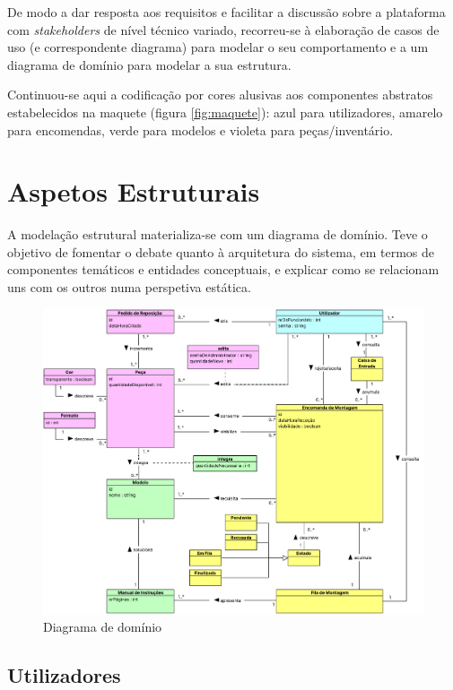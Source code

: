         De modo a dar resposta aos requisitos e facilitar a discussão sobre a plataforma com \textit{stakeholders} de nível técnico variado, recorreu-se à elaboração de casos de uso (e correspondente diagrama) para modelar o seu comportamento e a um diagrama de domínio para modelar a sua estrutura.

        Continuou-se aqui a codificação por cores alusivas aos componentes abstratos estabelecidos na maquete (figura \ref{fig:maquete}): azul para utilizadores, amarelo para encomendas, verde para modelos e violeta para peças/inventário.

    \newpage
    \section{Aspetos Estruturais}

         A modelação estrutural materializa-se com um diagrama de domínio. Teve o objetivo de fomentar o debate quanto à arquitetura do sistema, em termos de componentes temáticos e entidades conceptuais, e explicar como se relacionam uns com os outros numa perspetiva estática.

        \begin{figure}[h]
            \centering
            \includegraphics[width=1\textwidth]{images/cap3_diagclasses.pdf}
            \caption{Diagrama de domínio}
            \label{fig:diagclasses}
        \end{figure}

        \newpage
        \subsection{Utilizadores}

